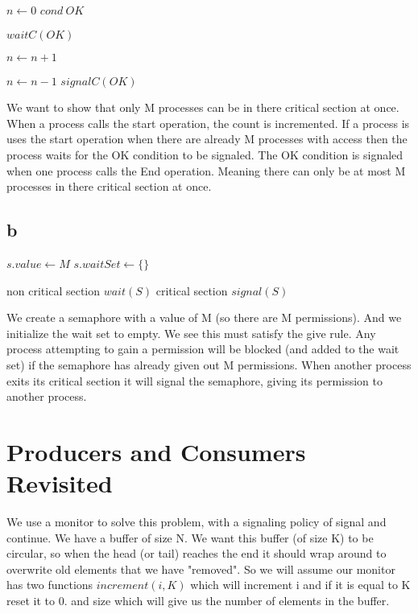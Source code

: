 \documentclass[a4paper, 12pt]{article}
\begin{document}
			\begin{algorithm}[H]
				\begin{algorithmic}[1]
						\State $n \gets 0$
						\State $cond\ OK$
					\EndProcedure
					
							\State $waitC(OK)$
						\EndIf
						
						\State $n \gets n+1$
					\EndProcedure
					
						\State $n \gets n-1$
						\State $signalC(OK)$
					\EndProcedure
				\end{algorithmic}
			\end{algorithm}		
			
				We want to show that only M processes can be in there critical section at once. When a process calls the start operation, the count is incremented. If a process is uses the start operation when there are already M processes with access then the process waits for the OK condition to be signaled. The OK condition is signaled when one process calls the End operation. Meaning there can only be at most M processes in there critical section at once.

				
		\subsection{b}
			\begin{algorithm}[H]
				\begin{algorithmic}[1]
						\State $s.value \gets M$
						\State $s.waitSet \gets \{\}$
					\EndProcedure
					
							\State non critical section
							\State $wait(S)$
							\State critical section
							\State $signal(S)$
						\EndWhile
					\EndProcedure
				\end{algorithmic}
			\end{algorithm}
			
			We create a semaphore with a value of M (so there are M permissions). And we initialize the wait set to empty. We see this must satisfy the give rule. Any process attempting to gain a permission will be blocked (and added to the wait set) if the semaphore has already given out M permissions. When another process exits its critical section it will signal the semaphore, giving its permission to another process.
				
	
	\section{Producers and Consumers Revisited}
		We use a monitor to solve this problem, with a signaling policy of signal and continue. We have a buffer of size N. We want this buffer (of size K) to be circular, so when the head (or tail) reaches the end it should wrap around to overwrite old elements that we have "removed". So we will assume our monitor has two functions $increment(i,K)$ which will increment i and if it is equal to K reset it to 0. and size which will give us the number of elements in the buffer.\\
		
\end{document}
